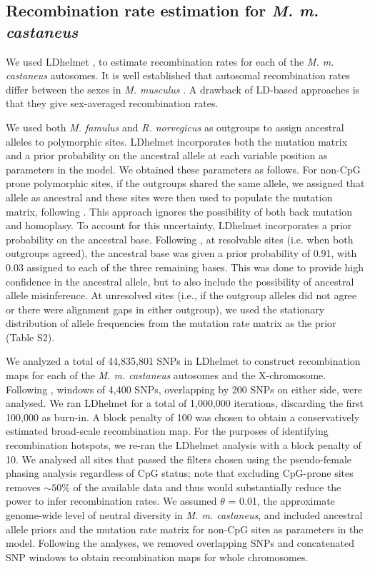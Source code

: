\subsection{Recombination rate estimation for \emph{M. m. castaneus}}
        	
        We used LDhelmet \citep{RN213}, to estimate recombination rates for each of the \emph{M. m. castaneus} autosomes. It is well established that autosomal recombination rates differ between the sexes in \emph{M. musculus} \citep{RN232, RN266}. A drawback of LD-based approaches is that they give sex-averaged recombination rates. 
 
        	We used both \emph{M. famulus} and \emph{R. norvegicus} as outgroups to assign ancestral alleles to polymorphic sites. LDhelmet incorporates both the mutation matrix and a prior probability on the ancestral allele at each variable position as parameters in the model. We obtained these parameters as follows. For non-CpG prone polymorphic sites, if the outgroups shared the same allele, we assigned that allele as ancestral and these sites were then used to populate the mutation matrix, following \cite{RN213}. This approach ignores the possibility of both back mutation and homoplasy. To account for this uncertainty, LDhelmet incorporates a prior probability on the ancestral base. Following \cite{RN258}, at resolvable sites (i.e. when both outgroups agreed), the ancestral base was given a prior probability of 0.91, with 0.03 assigned to each of the three remaining bases. This was done to provide high confidence in the ancestral allele, but to also include the possibility of ancestral allele misinference. At unresolved sites (i.e., if the outgroup alleles did not agree or there were alignment gaps in either outgroup), we used the stationary distribution of allele frequencies from the mutation rate matrix as the prior (Table S2).
 
We analyzed a total of 44,835,801 SNPs in LDhelmet to construct recombination maps for each of the \emph{M. m. castaneus} autosomes and the X-chromosome. Following \cite{RN213}, windows of 4,400 SNPs, overlapping by 200 SNPs on either side, were analysed. We ran LDhelmet for a total of 1,000,000 iterations, discarding the first 100,000 as burn-in. A block penalty of 100 was chosen to obtain a conservatively estimated broad-scale recombination map. For the purposes of identifying recombination hotspots, we re-ran the LDhelmet analysis with a block penalty of 10. We analysed all sites that passed the filters chosen using the pseudo-female phasing analysis regardless of CpG status; note that excluding CpG-prone sites removes $\sim50\%$ of the available data and thus would substantially reduce the power to infer recombination rates. We assumed $\theta$ = 0.01, the approximate genome-wide level of neutral diversity in \emph{M. m. castaneus}, and included ancestral allele priors and the mutation rate matrix for non-CpG sites as parameters in the model. Following the analyses, we removed overlapping SNPs and concatenated SNP windows to obtain recombination maps for whole chromosomes. 


